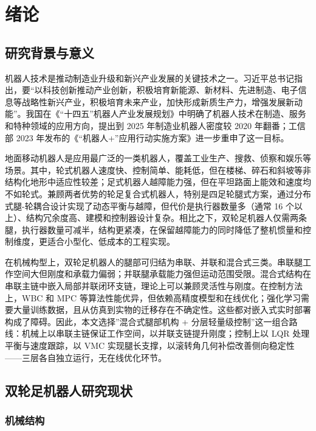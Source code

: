 \chapter{绪论}\label{chap:introduction}

\section{研究背景与意义}

机器人技术是推动制造业升级和新兴产业发展的关键技术之一。习近平总书记指出，要“以科技创新推动产业创新，积极培育新能源、新材料、先进制造、电子信息等战略性新兴产业，积极培育未来产业，加快形成新质生产力，增强发展新动能”。我国在《“十四五”机器人产业发展规划》中明确了机器人技术在制造、服务和特种领域的应用方向，提出到 2025 年制造业机器人密度较 2020 年翻番；工信部 2023 年发布的《“机器人+”应用行动实施方案》进一步重申了这一目标。

地面移动机器人是应用最广泛的一类机器人，覆盖工业生产、搜救、侦察和娱乐等场景。其中，轮式机器人速度快、控制简单、能耗低，但在楼梯、碎石和斜坡等非结构化地形中适应性较差；足式机器人越障能力强，但在平坦路面上能效和速度均不如轮式。兼顾两者优势的轮足复合式机器人\cite{ding2024}，特别是四足轮腿式方案\cite{hutter2016}，通过分布式腿-轮耦合设计实现了动态平衡与越障，但代价是执行器数量多（通常 16 个以上）、结构冗余度高、建模和控制器设计复杂。相比之下，双轮足机器人仅需两条腿，执行器数量可减半，结构更紧凑，在保留越障能力的同时降低了整机惯量和控制维度，更适合小型化、低成本的工程实现。

在机械构型上，双轮足机器人的腿部可归结为串联、并联和混合式三类。串联腿工作空间大但刚度和承载力偏弱；并联腿承载能力强但运动范围受限。混合式结构在串联主链中嵌入局部并联闭环支链，理论上可以兼顾灵活性与刚度。在控制方法上，WBC 和 MPC 等算法性能优异，但依赖高精度模型和在线优化；强化学习需要大量训练数据，且从仿真到实物的迁移存在不确定性。这些都对嵌入式实时部署构成了障碍。因此，本文选择”混合式腿部机构 + 分层轻量级控制”这一组合路线：机械上以串联主链保证工作空间，以并联支链提升刚度；控制上以 LQR 处理平衡与速度跟踪，以 VMC 实现腿长支撑，以滚转角几何补偿改善侧向稳定性——三层各自独立运行，无在线优化环节。

\section{双轮足机器人研究现状}

\subsection{机械结构}

